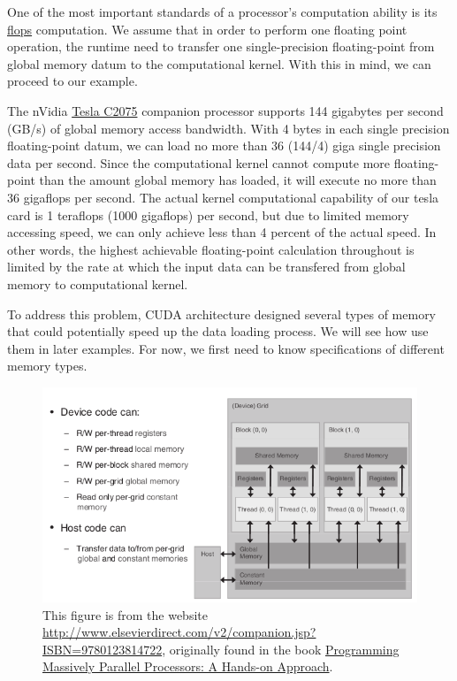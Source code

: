 \documentclass[letterpaper,10pt,openany,oneside]{sphinxmanual}
\begin{document}
One of the most important standards of a processor's computation ability is its \href{http://en.wikipedia.org/wiki/FLOPS}{flops} computation. We assume that in order to perform one floating point operation, the runtime need to transfer one single-precision floating-point from global memory datum to the computational kernel. With this in mind, we can proceed to our example.

The nVidia \href{http://www.nvidia.com/docs/IO/43395/NV-DS-Tesla-C2075.pdf}{Tesla C2075} companion processor supports 144 gigabytes per second (GB/s) of global memory access bandwidth. With 4 bytes in each single precision floating-point datum, we can load no more than 36 (144/4) giga single precision data per second. Since the computational kernel cannot compute more floating-point than the amount global memory has loaded, it will execute no more than 36 gigaflops per second. The actual kernel computational capability of our tesla card is 1 teraflops (1000 gigaflops) per second, but due to limited memory accessing speed, we can only achieve less than 4 percent of the actual speed. In other words, the highest achievable floating-point calculation throughout is limited by the rate at which the input data can be transfered from global memory to computational kernel.

To address this problem, CUDA architecture designed several types of memory that could potentially speed up the data loading process. We will see how use them in later examples. For now, we first need to know specifications of different memory types.
\begin{figure}[htbp]
\centering
\capstart

\includegraphics{MT.png}
\caption{This figure is from the website \href{http://www.elsevierdirect.com/v2/companion.jsp?ISBN=9780123814722}{http://www.elsevierdirect.com/v2/companion.jsp?ISBN=9780123814722}, originally found in the book \href{http://www.elsevierdirect.com/morgan\_kaufmann/kirk/}{Programming Massively Parallel Processors: A Hands-on Approach}.}\end{figure}
\end{document}
